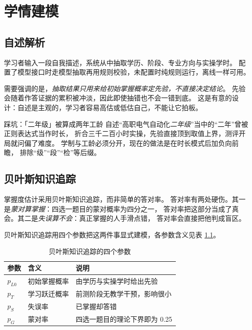 \chapter{学情建模}

\section{自述解析}

学习者输入一段自我描述，系统从中抽取学历、阶段、专业方向与实操学时。
配置了模型接口时走模型抽取再用规则校验，未配置时纯规则运行，离线一样可用。

需要强调的是，\emph{抽取结果只用来给初始掌握概率定先验，不直接决定结论}。
先验会随着作答证据的累积被冲淡，因此即使抽错也不会一错到底。
这是有意的设计：自述是主观的，学习者容易高估或低估自己，不能让它拍板。

\begin{keynote}{踩坑：「二年级」被算成两年工龄}
自述“高职电气自动化\emph{二年级}”当中的“二年”曾被正则表达式当作时长，
折合三千二百小时实操，先验直接顶到取值上界，测评开局就问偏了难度。
学制与工龄必须分开，现在的做法是在时长模式后加负向前瞻，
排除“级”“段”“检”等后缀。
\end{keynote}

\section{贝叶斯知识追踪}

掌握度估计采用贝叶斯知识追踪\cite{corbett1994}，而非简单的答对率。
答对率有两处硬伤。其一是\emph{蒙对算掌握}：四选一题目的蒙对概率为四分之一，
答对率把这部分当成了真会。其二是\emph{失误算不会}：真正掌握的人手滑点错，
答对率会直接把他判成盲区。

贝叶斯知识追踪用四个参数把这两件事显式建模，各参数含义见表 \ref{tab:bkt}。

\begin{table}[htbp]\centering\small
\caption{贝叶斯知识追踪的四个参数}\label{tab:bkt}
\begin{tabular}{@{}p{1.8cm}p{3.4cm}p{6.2cm}@{}}
\toprule
参数 & 含义 & 说明 \\
\midrule
$p_{L0}$ & 初始掌握概率 & 由学历与实操学时给出先验 \\
$p_T$ & 学习跃迁概率 & 前测阶段无教学干预，影响很小 \\
$p_S$ & 失误率 & 已掌握却答错 \\
$p_G$ & 蒙对率 & 四选一题目的理论下界即为 0.25 \\
\bottomrule
\end{tabular}
\end{table}

